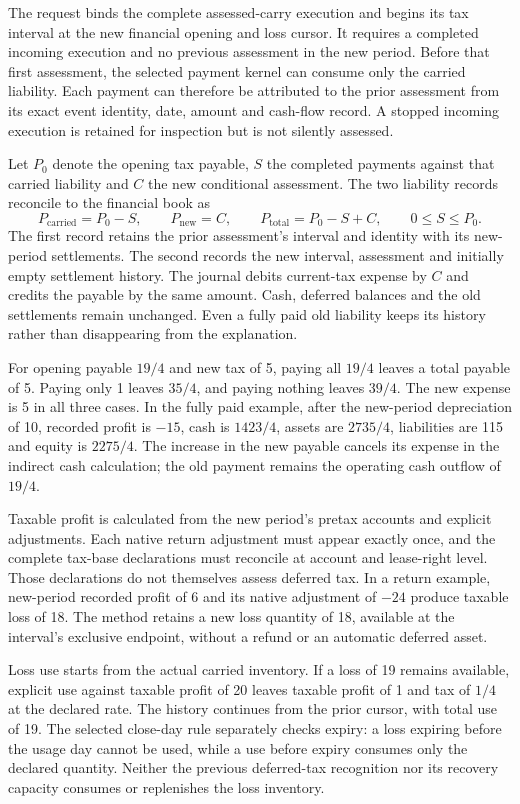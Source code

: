 The request binds the complete assessed-carry execution and begins its tax
interval at the new financial opening and loss cursor. It requires a completed
incoming execution and no previous assessment in the new period. Before that
first assessment, the selected payment kernel can consume only the carried
liability. Each payment can therefore be attributed to the prior assessment
from its exact event identity, date, amount and cash-flow record. A stopped
incoming execution is retained for inspection but is not silently assessed.

Let $P_0$ denote the opening tax payable, $S$ the completed payments against
that carried liability and $C$ the new conditional assessment. The two liability
records reconcile to the financial book as
\[
 P_{\mathrm{carried}}=P_0-S,\qquad
 P_{\mathrm{new}}=C,\qquad
 P_{\mathrm{total}}=P_0-S+C,\qquad 0\leq S\leq P_0.
\]
The first record retains the prior assessment's interval and identity with its
new-period settlements. The second records the new interval, assessment and
initially empty settlement history. The journal debits current-tax expense by
$C$ and credits the payable by the same amount. Cash, deferred balances and the
old settlements remain unchanged. Even a fully paid old liability keeps its
history rather than disappearing from the explanation.

For opening payable $19/4$ and new tax of 5, paying all $19/4$ leaves a total
payable of 5. Paying only 1 leaves $35/4$, and paying nothing leaves $39/4$.
The new expense is 5 in all three cases. In the fully paid example, after the
new-period depreciation of 10, recorded profit is $-15$, cash is $1423/4$,
assets are $2735/4$, liabilities are 115 and equity is $2275/4$. The increase
in the new payable cancels its expense in the indirect cash calculation; the
old payment remains the operating cash outflow of $19/4$.

Taxable profit is calculated from the new period's pretax accounts and explicit
adjustments. Each native return adjustment must appear exactly once, and the
complete tax-base declarations must reconcile at account and lease-right level.
Those declarations do not themselves assess deferred tax. In a return example,
new-period recorded profit of 6 and its native adjustment of $-24$ produce
taxable loss of 18. The method retains a new loss quantity of 18, available at
the interval's exclusive endpoint, without a refund or an automatic deferred
asset.

Loss use starts from the actual carried inventory. If a loss of 19 remains
available, explicit use against taxable profit of 20 leaves taxable profit of
1 and tax of $1/4$ at the declared rate. The history continues from the prior
cursor, with total use of 19. The selected close-day rule separately checks
expiry: a loss expiring before the usage day cannot be used, while a use before
expiry consumes only the declared quantity. Neither the previous deferred-tax
recognition nor its recovery capacity consumes or replenishes the loss inventory.

